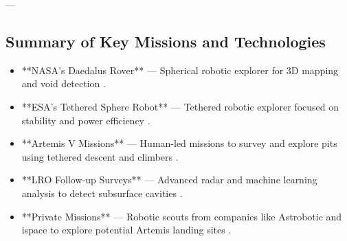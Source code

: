 ---

\subsection{Summary of Key Missions and Technologies}

\begin{itemize}
    \item **NASA's Daedalus Rover** — Spherical robotic explorer for 3D mapping and void detection \cite{thermal-lunar-pits}.
    \item **ESA's Tethered Sphere Robot** — Tethered robotic explorer focused on stability and power efficiency \cite{thermal-lunar-pits}.
    \item **Artemis V Missions** — Human-led missions to survey and explore pits using tethered descent and climbers \cite{thermal-lunar-pits}.
    \item **LRO Follow-up Surveys** — Advanced radar and machine learning analysis to detect subsurface cavities \cite{Carrer2024, new-wagner}.
    \item **Private Missions** — Robotic scouts from companies like Astrobotic and ispace to explore potential Artemis landing sites \cite{jsanders-isru}.
\end{itemize}